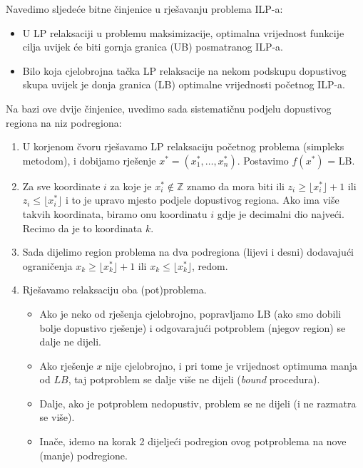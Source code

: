 \documentclass[a4paper, utf8, 11pt, colorlinks]{book}
\begin{document}
Navedimo sljedeće bitne činjenice u rješavanju problema  ILP-a:
\begin{itemize}
    \item  U LP relaksaciji u problemu 
           maksimizacije, optimalna vrijednost funkcije cilja 
           uvijek će biti gornja granica (UB) posmatranog ILP-a. 
    \item  Bilo koja cjelobrojna tačka LP relaksacije na nekom podskupu  
           dopustivog skupa uvijek je  donja granica (LB) optimalne vrijednosti početnog ILP-a. 
\end{itemize}
Na bazi ove dvije činjenice, uvedimo sada sistematičnu podjelu dopustivog regiona na niz podregiona:
\begin{enumerate}
    \item U korjenom čvoru rješavamo LP relaksaciju početnog problema     (simpleks metodom), i dobijamo rješenje $x^*=(x^*_1, \ldots, x^*_n)$.   Postavimo $f(x^*)$ = LB.
    \item Za sve koordinate $i$ za koje je $x^*_i \not \in \mathbb{Z}$ znamo da  mora biti ili $z_i \geq \lfloor x^*_i \rfloor + 1$ ili $z_i \leq \lfloor x^*_i \rfloor$ i to je upravo mjesto podjele dopustivog regiona. Ako ima više takvih koordinata, biramo onu koordinatu $i$ gdje je decimalni dio najveći.  Recimo da je to koordinata $k$.
    \item Sada dijelimo region problema na dva podregiona (lijevi i desni) dodavajući 
          ograničenja $x_k \geq \lfloor x^*_k \rfloor + 1$ ili $x_k \leq \lfloor x^*_k \rfloor$, redom.
    \item Rješavamo relaksaciju oba (pot)problema. 
    \begin{itemize}
    	\item  Ako je neko od rješenja cjelobrojno, popravljamo LB (ako smo dobili bolje dopustivo rješenje) i odgovarajući potproblem (njegov region) se dalje ne dijeli. 
    	\item Ako rješenje $x$ nije cjelobrojno, i pri tome je vrijednost optimuma manja od $LB$, taj potproblem se dalje više ne dijeli (\emph{bound} procedura). 
    	\item Dalje, ako je potproblem nedopustiv, problem se ne dijeli (i ne razmatra se više). 
    	\item Inače, idemo na korak 2 dijeljeći podregion ovog potproblema na nove (manje) podregione.    
    \end{itemize}

\end{enumerate}
\end{document}
